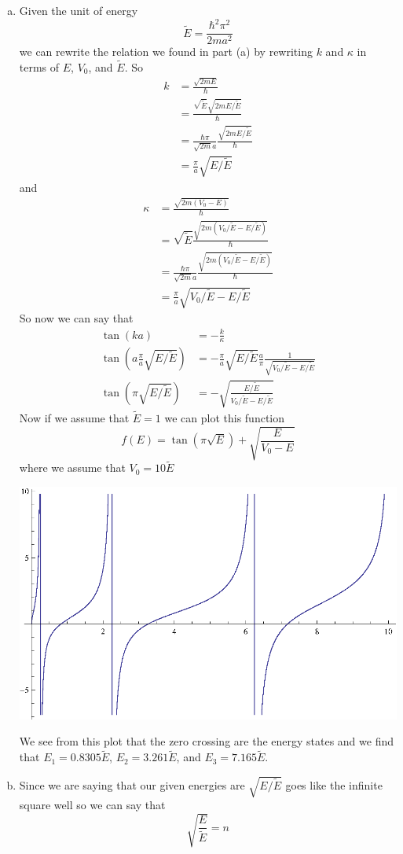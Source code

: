 \documentclass[11pt]{article}
\numberwithin{equation}{section}
\begin{document}
\begin{enumerate}[(a)]
\item
Given the unit of energy
$$\widetilde{E} = \frac{\hbar^2\pi^2}{2ma^2}$$
we can rewrite the relation we found in part (a) by rewriting $k$ and $\kappa$ in terms of $E$, $V_0$, and $\widetilde{E}$. So 
\begin{align*}
k &= \frac{\sqrt{2mE}}{\hbar}\\
&= \frac{\sqrt{\widetilde{E}}\sqrt{2mE/\widetilde{E}}}{\hbar}\\
&= \frac{\hbar \pi}{\sqrt{2m}a}\frac{\sqrt{2mE/\widetilde{E}}}{\hbar}\\
&= \frac{\pi}{a}\sqrt{E/\widetilde{E}}
\end{align*}
and
\begin{align*}
\kappa &= \frac{\sqrt{2m(V_0-E)}}{\hbar}\\
&= \sqrt{\widetilde{E}}\frac{\sqrt{2m(V_0/\widetilde{E}-E/\widetilde{E})}}{\hbar}\\
&= \frac{\hbar \pi}{\sqrt{2m}a}\frac{\sqrt{2m(V_0/\widetilde{E}-E/\widetilde{E})}}{\hbar}\\
&= \frac{\pi}{a}\sqrt{V_0/\widetilde{E}-E/\widetilde{E}}
\end{align*}
So now we can say that
\begin{align*}
\tan(ka) &= -\frac{k}{\kappa}\\
\tan\left(a\frac{\pi}{a}\sqrt{E/\widetilde{E}}\right) &= -\frac{\pi}{a}\sqrt{E/\widetilde{E}}\frac{a}{\pi}\frac{1}{\sqrt{V_0/\widetilde{E}-E/\widetilde{E}}}\\
\tan\left(\pi\sqrt{E/\widetilde{E}}\right) &= -\sqrt{\frac{E/\widetilde{E}}{V_0/\widetilde{E}-E/\widetilde{E}}}
\end{align*}
Now if we assume that $\widetilde{E} = 1$ we can plot this function 
$$f(E) = \tan(\pi\sqrt{E})+\sqrt{\frac{E}{V_0-E}}$$
where we assume that $V_0 = 10\widetilde{E}$
\begin{center}
\includegraphics[scale=1.0]{Prob3.partc.eps}
\end{center}
We see from this plot that the zero crossing are the energy states and we find that $E_1 = 0.8305\widetilde{E}$, $E_2 = 3.261\widetilde{E}$, and $E_3 = 7.165\widetilde{E}$.
\item
Since we are saying that our given energies are $\sqrt{E/\widetilde{E}}$ goes like the infinite square well so we can say that 
$$\sqrt{\frac{E}{\widetilde{E}}} = n$$


\end{enumerate}
\end{document}
